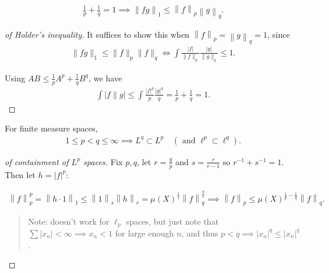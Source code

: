 \begin{proposition}

\begin{align*}  
\frac 1 p + \frac 1 q = 1 \implies {\left\lVert {f g} \right\rVert}_{1} \leq {\left\lVert {f} \right\rVert}_{p} {\left\lVert {g} \right\rVert}_{q}
.\end{align*}

\end{proposition}

\begin{proof}[of Holder's inequality]

It suffices to show this when
\({\left\lVert {f} \right\rVert}_p = {\left\lVert {g} \right\rVert}_q = 1\),
since
\begin{align*}  
\|f g\|_{1} \leq\|f\|_{p}\|f\|_{q} \Longleftrightarrow \int \frac{|f|}{\|f\|_{p}} \frac{|g|}{\|g\|_{q}} \leq 1
.\end{align*}

Using \(AB \leq \frac 1 p A^p + \frac 1 q B^q\), we have
\begin{align*}  
\int|f \| g| \leq \int \frac{|f|^{p}}{p} \frac{|g|^{q}}{q}=\frac{1}{p}+\frac{1}{q}=1
.\end{align*}

\end{proof}

\begin{example}

For finite measure spaces,
\begin{align*}
1 \leq p < q \leq \infty \implies L^q \subset L^p \quad (\text{ and } \ell^p \subset \ell^q)
.\end{align*}

\end{example}

\begin{proof}[of containment of $L^p$ spaces]

Fix \(p, q\), let \(r = \frac q p\) and \(s = \frac{r}{r-1}\) so
\(r^{-1}+ s^{-1}= 1\). Then let
\(h = {\left\lvert {f} \right\rvert}^p\):

\begin{align*}  
{\left\lVert {f} \right\rVert}_{p}^p 
= {\left\lVert {h\cdot 1} \right\rVert}_{1} \leq {\left\lVert {1} \right\rVert}_{s} {\left\lVert {h} \right\rVert}_{r} 
= \mu(X)^{\frac 1 s} {\left\lVert {f} \right\rVert}_{q}^{\frac q r}
\implies {\left\lVert {f} \right\rVert}_{p} 
\leq \mu(X)^{\frac 1 p - \frac 1 q} {\left\lVert {f} \right\rVert}_{q}
.\end{align*}

\begin{quote}
Note: doesn't work for \(\ell_p\) spaces, but just note that
\(\sum {\left\lvert {x_n} \right\rvert} < \infty \implies x_n < 1\) for
large enough \(n\), and thus
\(p<q \implies {\left\lvert {x_n} \right\rvert}^q \leq {\left\lvert {x_n} \right\rvert}^q\).
\end{quote}

\end{proof}

